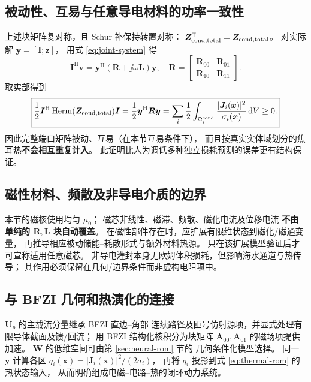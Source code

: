 \subsection{被动性、互易与任意导电材料的功率一致性}
上述块矩阵复对称，且 Schur 补保持转置对称：
\(\bm Z_{\rm cond,total}^{\mathsf T}=\bm Z_{\rm cond,total}\)。
对实际解 \(\bm y=[\bm I;\bm z]\)，
用式 \eqref{eq:joint-system} 得
\[
\bm I^{\mathrm H}\bm v
=\bm y^{\mathrm H}
(\bm R+\jj\omega\bm L)\bm y,
\quad
\bm R=
\begin{bmatrix}\bm R_{00}&\bm R_{01}\\
\bm R_{10}&\bm R_{11}\end{bmatrix}.
\]
取实部得到
\begin{equation}
\boxed{
\frac12\bm I^{\mathrm H}
\operatorname{Herm}(\bm Z_{\rm cond,total})\bm I
=\frac12\bm y^{\mathrm H}\bm R\bm y
=\sum_i\frac12\int_{\Omega_i^{\rm cond}}
\frac{|\bm J_i(\bm x)|^2}{\sigma_i(\bm x)}\,\mathrm dV\ge0.
}
\label{eq:joint-power}
\end{equation}
因此完整端口矩阵被动、互易（在本节互易条件下），
而且按真实实体域划分的焦耳热\textbf{不会相互重复计入}。
此证明比人为调低多种独立损耗预测的误差更有结构保证。

\subsection{磁性材料、频散及非导电介质的边界}
本节的磁核使用均匀 \(\mu_0\)；
磁芯非线性、磁滞、频散、磁化电流及位移电流
\textbf{不由单纯的 \(\bm R,\bm L\) 块自动覆盖}。
在磁性部件存在时，应扩展有限维状态到磁化/磁通变量，
再推导相应被动储能--耗散形式与额外材料热源。
只在该扩展模型验证后才可宣称适用任意磁芯。
非导电灌封本身无欧姆体积损耗，但影响海水通道与热传导；
其作用必须保留在几何/边界条件而非虚构电阻项中。

\subsection{与 BFZI 几何和热演化的连接}
\(\bm U_p\) 的主载流分量继承 BFZI 直边--角部
连续路径及匝号仿射源项，并显式处理有限导体截面及馈/回流；
用 BFZI 结构化核积分为块矩阵
\(\bm A_{00},\bm A_{01}\) 的磁场项提供加速。
\(\bm W\) 的低维空间可由第 \ref{sec:neural-rom} 节的
几何条件化模型选择。
同一 \(\bm y\) 计算各区
\(q_i(\bm x)=|\bm J_i(\bm x)|^2/(2\sigma_i)\)，
再将 \(q_i\) 投影到式 \eqref{eq:thermal-rom} 的热状态输入，
从而明确组成电磁--电路--热的闭环动力系统。
